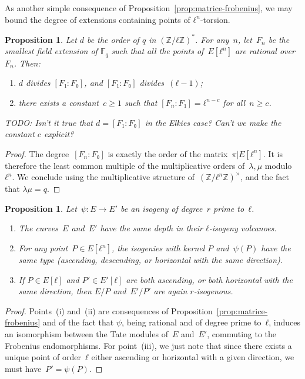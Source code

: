 \documentclass{lms}
\newcommand{\todo}[1]{{\color{red}TODO: #1}}
\newtheorem{prop}[thm]{Proposition}
\newcommand{\F}{\mathbb{F}}
\begin{document}
As another simple consequence of Proposition~\ref{prop:matrice-frobenius},
we may bound the degree of extensions containing points of $ℓ^n$-torsion.
\begin{prop}\label{prop:degree-l-torsion}
  Let $d$ be the order of $q$ in $(ℤ/ℓℤ)^\ast$. For any~$n$, let~$F_n$
  be the smallest field extension of $\F_q$ such that all the points
  of~$E[ℓ^n]$ are rational over~$F_n$.  Then:
\begin{enumerate}
\item $d$ divides $[F₁:F₀]$, and $[F₁:F₀]$ divides~$(ℓ-1)$;
\item there exists a constant~$c ≥ 1$ such that $[F_n:F₁] = ℓ^{n-c}$
  for all~$n ≥ c$.
\end{enumerate}
\todo{Isn't it true that $d=[F₁:F₀]$ in the Elkies case? Can't we make
  the constant $c$ explicit?}
\end{prop}
\begin{proof}
The degree~$[F_n:F₀]$ is exactly the order of the matrix~$π|E[ℓ^n]$.
It is therefore the least common multiple of the multiplicative orders
of~$λ, μ$ modulo~$ℓ^n$.
We conclude using the multiplicative structure of~$(ℤ/ℓ^n ℤ)^×$, and the fact
that $λμ=q$.
\end{proof}


\begin{prop}\label{prop:isogenie-premiere}
Let~$ψ: E → E'$ be an isogeny of degree~$r$ prime to~$ℓ$.
\begin{enumerate}
\item The curves~$E$ and~$E'$ have the same depth
in their $ℓ$-isogeny volcanoes.
\item For any point~$P ∈ E[ℓ^n]$,
the isogenies with kernel $P$ and~$ψ(P)$ have the same type
(ascending, descending, or horizontal with the same direction).
\item If $P ∈ E[ℓ]$ and $P' ∈ E'[ℓ]$ are both ascending,
or both horizontal with the same direction,
then $E/P$ and~$E'/P'$ are again $r$-isogenous.
\end{enumerate}
\end{prop}
\begin{proof}
Points~(i) and~(ii) are consequences of Proposition~\ref{prop:matrice-frobenius}
and of the fact that $ψ$, being rational and of degree prime to~$ℓ$,
induces an isomorphism between the Tate modules of~$E$ and~$E'$,
commuting to the Frobenius endomorphisms.
For point~(iii), we just note that
since there exists a unique point of order~$ℓ$
either ascending or horizontal with a given direction,
we must have~$P' = ψ(P)$.
\end{proof}
\end{document}
